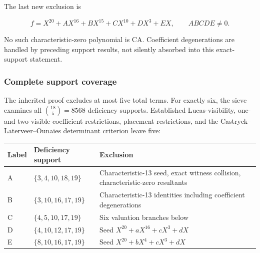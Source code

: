 \documentclass[
  british,
  10pt,
]{article}
\newcounter{none} %
\begin{document}
The last new exclusion is

\[
f=X^{20}+AX^{16}+BX^{15}+CX^{10}+DX^3+EX,\qquad ABCDE\ne0.
\tag{C}
\]

No such characteristic-zero polynomial is CA. Coefficient degenerations
are handled by preceding support results, not silently absorbed into
this exact-support statement.

\subsubsection{Complete support
coverage}\label{complete-support-coverage}

The inherited proof excludes at most five total terms. For exactly six,
the sieve examines all \(\binom{18}{5}=8568\) deficiency supports.
Established Lucas-visibility, one- and two-visible-coefficient
restrictions, placement restrictions, and the
Castryck--Laterveer--Ounaïes determinant criterion leave five:

{\def\LTcaptype{none} %
\begin{longtable}[]{@{}
  >{\raggedright\arraybackslash}p{}
  >{\raggedright\arraybackslash}p{}
  >{\raggedright\arraybackslash}p{}@{}}
\toprule\noalign{}
\begin{minipage}[b]{\linewidth}\raggedright
Label
\end{minipage} & \begin{minipage}[b]{\linewidth}\raggedright
Deficiency support
\end{minipage} & \begin{minipage}[b]{\linewidth}\raggedright
Exclusion
\end{minipage} \\
\midrule\noalign{}
\endhead
\bottomrule\noalign{}
\endlastfoot
A & \(\{3,4,10,18,19\}\) & Characteristic-13 seed, exact witness
collision, characteristic-zero resultants \\
B & \(\{3,10,16,17,19\}\) & Characteristic-13 identities including
coefficient degenerations \\
C & \(\{4,5,10,17,19\}\) & Six valuation branches below \\
D & \(\{4,10,12,17,19\}\) & Seed \(X^{20}+aX^{16}+cX^3+dX\) \\
E & \(\{8,10,16,17,19\}\) & Seed \(X^{20}+bX^4+cX^3+dX\) \\
\end{longtable}
}
\end{document}
